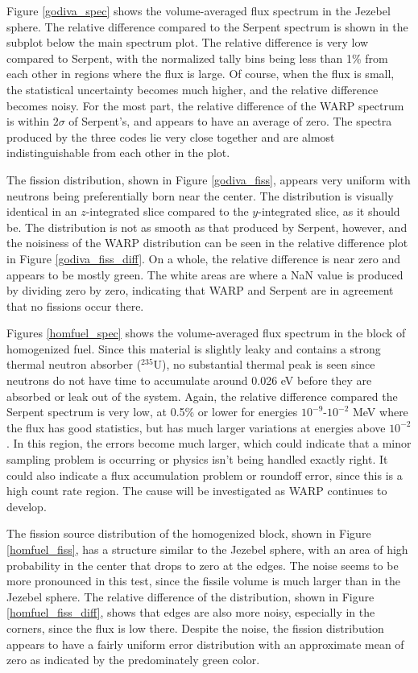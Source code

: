 Figure \ref{godiva_spec} shows the volume-averaged flux spectrum in the Jezebel sphere.  The relative difference compared to the Serpent spectrum is shown in the subplot below the main spectrum plot.  The relative difference is very low compared to Serpent, with the normalized tally bins being less than 1\% from each other in regions where the flux is large.  Of course, when the flux is small, the statistical uncertainty becomes much higher, and the relative difference becomes noisy.   For the most part, the relative difference of the WARP spectrum is within $2\sigma$ of Serpent's, and appears to have an average of zero.  The spectra produced by the three codes lie very close together and are almost indistinguishable from each other in the plot. 

The fission distribution, shown in Figure \ref{godiva_fiss}, appears very uniform with neutrons being preferentially born near the center.  The distribution is visually identical in an $z$-integrated slice compared to the $y$-integrated slice, as it should be.  The distribution is not as smooth as that produced by Serpent, however, and the noisiness of the WARP distribution can be seen in the relative difference plot in Figure \ref{godiva_fiss_diff}.  On a whole, the relative difference is near zero and appears to be mostly green.  The white areas are where a NaN value is produced by dividing zero by zero, indicating that WARP and Serpent are in agreement that no fissions occur there.




Figures \ref{homfuel_spec} shows the volume-averaged flux spectrum in the block of homogenized fuel.   Since this material is slightly leaky and contains a strong thermal neutron absorber ($^{235}$U), no substantial thermal peak is seen since neutrons do not have time to accumulate around 0.026 eV before they are absorbed or leak out of the system.   Again, the relative difference compared the Serpent spectrum is very low, at 0.5\% or lower for energies $10^{-9}$-$10^{-2}$ MeV where the flux has good statistics, but has much larger variations at energies above $10^{-2}$.  In this region, the errors become much larger, which could indicate that a minor sampling problem is occurring or physics isn't being handled exactly right.  It could also indicate a flux accumulation problem or roundoff error, since this is a high count rate region.  The cause will be investigated as WARP continues to develop.  

The fission source distribution of the homogenized block, shown in Figure \ref{homfuel_fiss}, has a structure similar to the Jezebel sphere, with an area of high probability in the center that drops to zero at the edges.  The noise seems to be more pronounced in this test, since the fissile volume is much larger than in the Jezebel sphere.  The relative difference of the distribution, shown in Figure \ref{homfuel_fiss_diff}, shows that edges are also more noisy, especially in the corners, since the flux is low there.  Despite the noise, the fission distribution appears to have a fairly uniform error distribution with an approximate mean of zero as indicated by the predominately green color.  




